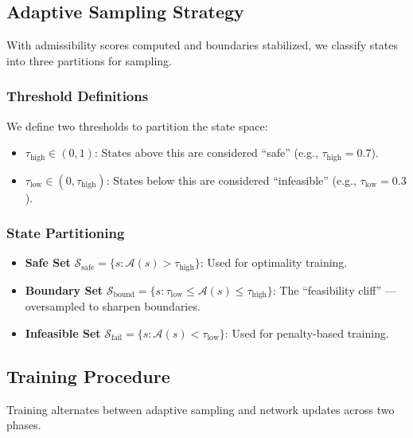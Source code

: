 \subsection{Adaptive Sampling Strategy}\label{sec:sampling}

With admissibility scores computed and boundaries stabilized, we classify states into three partitions for sampling.

\subsubsection{Threshold Definitions}
We define two thresholds to partition the state space:
\begin{itemize}
    \item $\tau_{\text{high}} \in (0,1)$: States above this are considered ``safe'' (e.g., $\tau_{\text{high}} = 0.7$).
    \item $\tau_{\text{low}} \in (0, \tau_{\text{high}})$: States below this are considered ``infeasible'' (e.g., $\tau_{\text{low}} = 0.3$).
\end{itemize}

\subsubsection{State Partitioning}
\begin{itemize}
    \item \textbf{Safe Set} $\mathcal{S}_{\text{safe}} = \{s : \mathcal{A}(s) > \tau_{\text{high}}\}$: Used for optimality training.
    \item \textbf{Boundary Set} $\mathcal{S}_{\text{bound}} = \{s : \tau_{\text{low}} \leq \mathcal{A}(s) \leq \tau_{\text{high}}\}$: The ``feasibility cliff'' --- oversampled to sharpen boundaries.
    \item \textbf{Infeasible Set} $\mathcal{S}_{\text{fail}} = \{s : \mathcal{A}(s) < \tau_{\text{low}}\}$: Used for penalty-based training.
\end{itemize}


\subsection{Training Procedure}\label{sec:training}

Training alternates between adaptive sampling and network updates across two phases.

